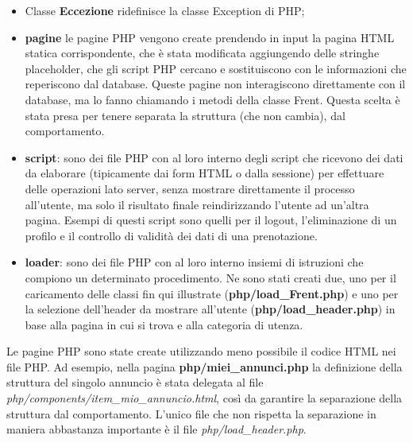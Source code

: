 \documentclass[1_relazione.tex]{subfiles}
\begin{document}
\begin{itemize}
    \item Classe \textbf{Eccezione} ridefinisce la classe Exception di PHP;
    \item \textbf{pagine} le pagine PHP vengono create prendendo in input la pagina HTML statica corrispondente, che è stata modificata aggiungendo delle stringhe placeholder, che gli script PHP cercano e sostituiscono con le informazioni che reperiscono dal database.
    Queste pagine non interagiscono direttamente con il database, ma lo fanno chiamando i metodi della classe Frent.
    Questa scelta \`{e} stata presa per tenere separata la struttura (che non cambia), dal comportamento.
    \item \textbf{script}: sono dei file PHP con al loro interno degli script che ricevono dei dati da elaborare (tipicamente dai form HTML o dalla sessione) per effettuare delle operazioni lato server, senza mostrare direttamente il processo all'utente, ma solo il risultato finale reindirizzando l'utente ad un'altra pagina.
    Esempi di questi script sono quelli per il logout, l'eliminazione di un profilo e il controllo di validità dei dati di una prenotazione.
    \item \textbf{loader}: sono dei file PHP con al loro interno insiemi di istruzioni che compiono un determinato procedimento. Ne sono stati creati due, uno per il caricamento delle classi fin qui illustrate (\textbf{php/load\_Frent.php}) e uno per la selezione dell'header da mostrare all'utente (\textbf{php/load\_header.php}) in base alla pagina in cui si trova e alla categoria di utenza.
\end{itemize}
Le pagine PHP sono state create utilizzando meno possibile il codice HTML nei file PHP.
Ad esempio, nella pagina \textbf{php/miei\_annunci.php} la definizione della struttura del singolo annuncio \`{e} stata delegata al file \textit{php/components/item\_mio\_annuncio.html}, così da garantire la separazione della struttura dal comportamento.
L'unico file che non rispetta la separazione in maniera abbastanza importante è il file \textit{php/load\_header.php}.\\
\end{document}
